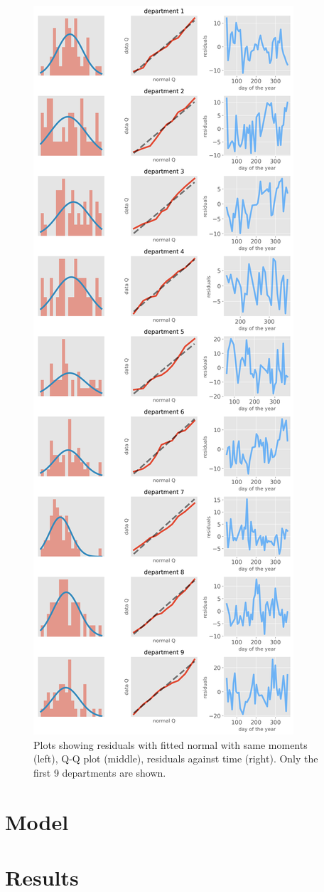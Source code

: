 \documentclass[paper=a4, fontsize=11pt]{scrartcl}
\numberwithin{equation}{section}		%
\numberwithin{figure}{section}			%
\numberwithin{table}{section}				%
\begin{document}
    
\begin{figure}[h]\label{corr_mat}
\centering
\includegraphics[width=.6\textwidth]{normal_approx_1.png}
\caption{Plots showing residuals with fitted normal with same moments (left), Q-Q plot (middle), residuals against time (right). Only the first 9 departments are shown.}
\end{figure}


\section{Model}
\section{Results}





\printbibliography
\end{document}
